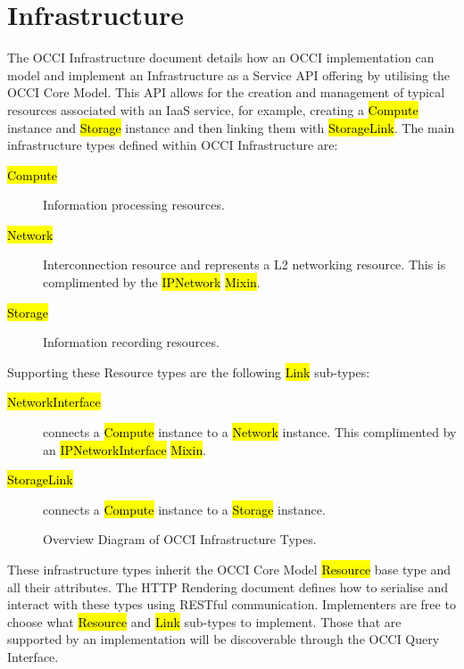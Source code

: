 \documentclass[10pt,a4paper]{article}
\begin{document}

\section{Infrastructure}
The OCCI Infrastructure document details how an OCCI implementation
can model and implement an Infrastructure as a Service API offering by
utilising the OCCI Core Model. This API allows for the creation and
management of typical resources associated with an IaaS service, for
example, creating a \hl{Compute} instance and \hl{Storage} instance
and then linking them with \hl{StorageLink}. The main infrastructure
types defined within OCCI Infrastructure are:

\begin{description}
\item[\hl{Compute}] Information processing resources.
\item[\hl{Network}] Interconnection resource and represents a L2
  networking resource. This is complimented by the \hl{IPNetwork}
  \hl{Mixin}.
\item[\hl{Storage}] Information recording resources.
\end{description}

Supporting these Resource types are the following \hl{Link} sub-types:

\begin{description}
\item[\hl{NetworkInterface}] connects a \hl{Compute} instance to a
  \hl{Network} instance. This complimented by an
  \hl{IPNetworkInterface} \hl{Mixin}.
\item[\hl{StorageLink}] connects a \hl{Compute} instance to a
  \hl{Storage} instance.
\end{description}

\begin{figure}[!h]
	{\centering {} \par}
	\caption{Overview Diagram of OCCI Infrastructure Types.}
	\label{fig:infra_uml}
\end{figure}

These infrastructure types inherit the OCCI Core Model \hl{Resource}
base type and all their attributes. The HTTP Rendering document
\cite{occi:http_rendering} defines how to serialise and interact with
these types using RESTful communication. Implementers are free to
choose what \hl{Resource} and \hl{Link} sub-types to implement. Those
that are supported by an implementation will be discoverable through
the OCCI Query Interface.
\end{document}
